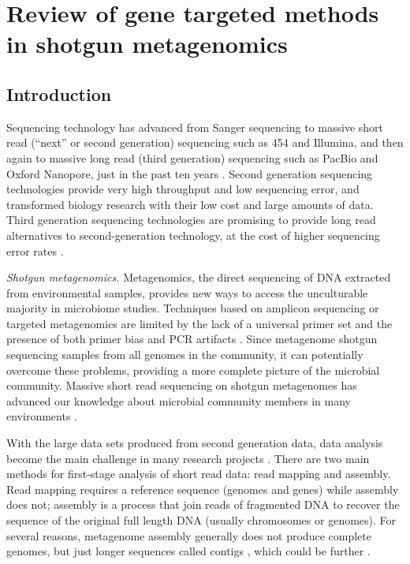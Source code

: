 \documentclass[]{msu-thesis}
\begin{document}
\chapter{Review of gene targeted methods in shotgun metagenomics}

\section{Introduction}

Sequencing technology has advanced from Sanger sequencing to massive
short read (``next'' or second generation) sequencing such as 454 and
Illumina, and then again to massive long read (third generation) sequencing such
as PacBio and Oxford Nanopore, just in the past ten years
\cite{mardis_impact_2008,pettersson_generations_2009}. Second
generation sequencing technologies provide very high throughput and
low sequencing error, and transformed biology
research with their low cost and large amounts of data. Third generation sequencing technologies are
promising to provide long read alternatives to second-generation technology, at the cost of higher
sequencing error rates \cite{rhoads_pacbio_2015}.

\textit{Shotgun metagenomics. } Metagenomics, the direct sequencing of
DNA extracted from environmental samples, provides new ways to access the
unculturable majority in microbiome studies.  Techniques based on amplicon sequencing or targeted
metagenomics are limited by the lack of a universal primer set and the presence of both primer bias and
PCR artifacts
\cite{frank_critical_2008,haas_chimeric_2011,guo_microbial_2015}. Since
metagenome shotgun sequencing samples from all
genomes in the community, it can potentially overcome these problems,
providing a more complete picture of the microbial community. Massive short read
sequencing on shotgun metagenomes has advanced our knowledge about
microbial community members in many environments
\cite{howe_tackling_2014,sunagawa_ocean_2015}.

With the large data sets produced from second generation data, data analysis
become the main challenge in many research projects
\cite{qin_human_2010,pell_scaling_2012}. There are two main methods
for first-stage analysis of short read data: read mapping and assembly. Read mapping requires a
reference sequence (genomes and genes) while assembly does not; assembly
is a process that join reads of fragmented DNA to recover the sequence
of the original full length DNA (usually chromosomes or genomes). For several
reasons, metagenome assembly generally does not produce complete genomes, but just
longer sequences called contigs
\cite{qin_human_2010,howe_tackling_2014}, which could be further
\cite{zerbino_velvet:_2008}.
\end{document}
